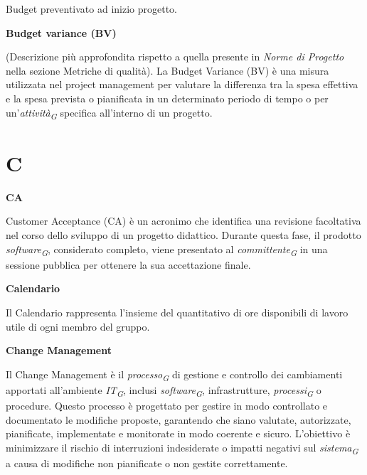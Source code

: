 \documentclass{article}
\begin{document}
\vspace{0.1cm}

Budget preventivato ad inizio progetto.

\vspace{0.4cm}

\textbf{Budget variance (BV)}

\vspace{0.1cm}

(Descrizione più approfondita rispetto a quella presente in \textit{Norme di Progetto} nella sezione Metriche di qualità).
La Budget Variance (BV) è una misura utilizzata nel project management per valutare la differenza tra la spesa effettiva e la spesa prevista o pianificata in un determinato periodo di tempo o per un'\textit{attività}\textsubscript{\textit{G}} specifica all'interno di un progetto.

\pagebreak
\section*{C}
{}

\vspace{0.4cm}

\textbf{CA}

\vspace{0.1cm}

Customer Acceptance (CA) è un acronimo che identifica una revisione facoltativa nel corso dello sviluppo di un progetto didattico. Durante questa fase, il prodotto \textit{software}\textsubscript{\textit{G}}, considerato completo, viene presentato al \textit{committente}\textsubscript{\textit{G}} in una sessione pubblica per ottenere la sua accettazione finale.

\vspace{0.4cm}

\textbf{Calendario}

\vspace{0.1cm}

Il Calendario rappresenta l’insieme del quantitativo di ore disponibili di lavoro utile di ogni membro del gruppo.

\vspace{0.4cm}

\textbf{Change Management}

\vspace{0.1cm}

Il Change Management è il \textit{processo}\textsubscript{\textit{G}} di gestione e controllo dei cambiamenti apportati all'ambiente \textit{IT}\textsubscript{\textit{G}}, inclusi \textit{software}\textsubscript{\textit{G}}, infrastrutture, \textit{processi}\textsubscript{\textit{G}} o procedure. Questo processo è progettato per gestire in modo controllato e documentato le modifiche proposte, garantendo che siano valutate, autorizzate, pianificate, implementate e monitorate in modo coerente e sicuro. L'obiettivo è minimizzare il rischio di interruzioni indesiderate o impatti negativi sul \textit{sistema}\textsubscript{\textit{G}} a causa di modifiche non pianificate o non gestite correttamente.
\end{document}
